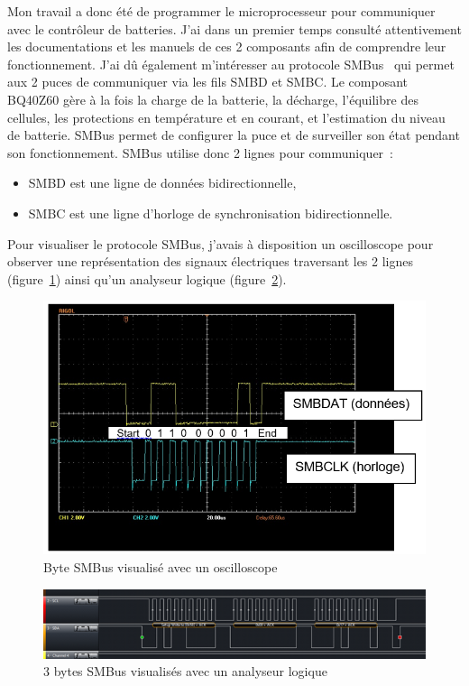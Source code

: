 \documentclass[a4paper, 12pt, sffamily]{report}
\begin{document}
Mon travail a donc été de programmer le microprocesseur pour communiquer avec le contrôleur de batteries. J’ai dans un premier temps consulté attentivement les documentations et les manuels de ces 2 composants afin de comprendre leur fonctionnement. J’ai dû également m’intéresser au protocole SMBus~\cite{smbus_spec} qui permet aux 2 puces de communiquer via les fils SMBD et SMBC.
Le composant BQ40Z60 gère à la fois la charge de la batterie, la décharge, l’équilibre des cellules, les protections en température et en courant, et l’estimation du niveau de batterie. SMBus permet de configurer la puce et de surveiller son état pendant son fonctionnement.
SMBus utilise donc 2 lignes pour communiquer~:
\begin{itemize} %
\item SMBD est une ligne de données bidirectionnelle,
\item SMBC est une ligne d'horloge de synchronisation bidirectionnelle.
\end{itemize}

Pour visualiser le protocole SMBus, j’avais à disposition un oscilloscope pour observer une représentation des signaux électriques traversant les 2 lignes (figure~\ref{fig:SMBus_oscilloscope}) ainsi qu’un analyseur logique (figure~\ref{fig:SMBus_logic_analyser}).

\begin{figure}[H]
\centering
\includegraphics[scale=0.6]{figures/screenshots/SMBus_oscilloscope.png}
\caption{Byte SMBus visualisé avec un oscilloscope}
\label{fig:SMBus_oscilloscope}
\end{figure}

\begin{figure}[H]
\centering
\includegraphics[scale=0.9]{figures/screenshots/SMBus_logic_analyser.png}
\caption{3 bytes SMBus visualisés avec un analyseur logique}
\label{fig:SMBus_logic_analyser}
\end{figure}
\end{document}
